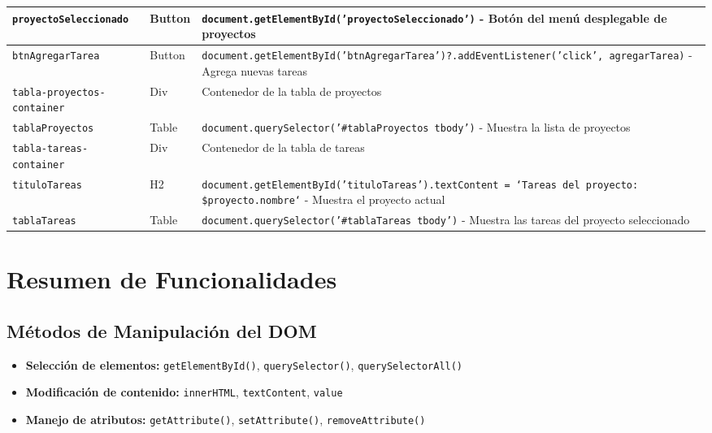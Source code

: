 \documentclass[12pt,a4paper]{article}
\begin{document}
\begin{longtable}{|p{4cm}|p{3cm}|p{8cm}|}
\texttt{proyectoSeleccionado} & Button & \texttt{document.getElementById('proyectoSeleccionado')} - Botón del menú desplegable de proyectos \\
\hline

\texttt{btnAgregarTarea} & Button & \texttt{document.getElementById('btnAgregarTarea')?.addEventListener('click', agregarTarea)} - Agrega nuevas tareas \\
\hline

\texttt{tabla-proyectos-container} & Div & Contenedor de la tabla de proyectos \\
\hline

\texttt{tablaProyectos} & Table & \texttt{document.querySelector('\#tablaProyectos tbody')} - Muestra la lista de proyectos \\
\hline

\texttt{tabla-tareas-container} & Div & Contenedor de la tabla de tareas \\
\hline

\texttt{tituloTareas} & H2 & \texttt{document.getElementById('tituloTareas').textContent = `Tareas del proyecto: \${proyecto.nombre}`} - Muestra el proyecto actual \\
\hline

\texttt{tablaTareas} & Table & \texttt{document.querySelector('\#tablaTareas tbody')} - Muestra las tareas del proyecto seleccionado \\
\hline

\end{longtable}

\section{Resumen de Funcionalidades}

\subsection{Métodos de Manipulación del DOM}
\begin{itemize}
\item \textbf{Selección de elementos:} \texttt{getElementById()}, \texttt{querySelector()}, \texttt{querySelectorAll()}
\item \textbf{Modificación de contenido:} \texttt{innerHTML}, \texttt{textContent}, \texttt{value}
\item \textbf{Manejo de atributos:} \texttt{getAttribute()}, \texttt{setAttribute()}, \texttt{removeAttribute()}
\end{itemize}
\end{document}
